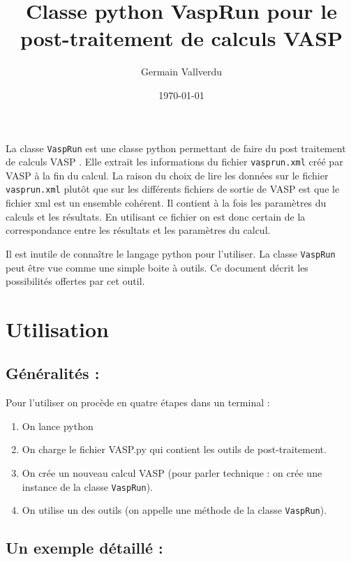 \documentclass[10pt,a4paper,fleqn]{article}
\title{Classe python VaspRun pour le post-traitement de calculs VASP}
\author{Germain Vallverdu}
\date{\today}
\begin{document}
\renewcommand{\labelitemi}{\hspace{3ex} $\bullet$} 

\maketitle

La classe \verb!VaspRun! est une classe python permettant de faire du post traitement de calculs
VASP . Elle extrait les informations du fichier \verb!vasprun.xml! créé par VASP à la fin du calcul.
La raison du choix de lire les données sur le fichier \verb!vasprun.xml! plutôt que sur les différents
fichiers de sortie de VASP est que le fichier xml est un ensemble cohérent. Il contient à la fois
les paramètres du calculs et les résultats. En utilisant ce fichier on est donc certain de la
correspondance entre les résultats et les paramètres du calcul.

Il est inutile de connaître le langage python pour l'utiliser. La classe \verb!VaspRun! peut être vue
comme une simple boite à outils. Ce document décrit les possibilités offertes par cet outil.

\tableofcontents

\newpage

\section{Utilisation}

\subsection{Généralités :}

Pour l'utiliser on procède en quatre étapes dans un terminal :

\begin{enumerate}
	\item On lance python
	\item On charge le fichier VASP.py qui contient les outils de post-traitement.
	\item On crée un nouveau calcul VASP (pour parler technique : on crée une
		instance de la classe \verb!VaspRun!).
	\item On utilise un des outils (on appelle une méthode de la classe \verb!VaspRun!).
\end{enumerate}

\subsection{Un exemple détaillé :}
\end{document}
